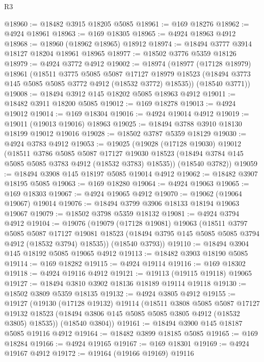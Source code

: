\begin{lexlean}{R3}
\begin{coremodule}
@18960 := @18482 @3915 @18205 @5085
@18961 := @169 @18276
@18962 := @4924 @18961
@18963 := @169 @18305
@18965 := @4924 @18963 @4912
@18968 := @18960 (@18962 @18965) @18912
@18974 := @18494 @3777 @3914 @18127 @18204 @18961 @18965
@18977 := @18502 @3776 @5359 @18126
@18979 := @4924 @3772 @4912
@19002 := @18974
    (@18977
      (@17128 @18979)
      @18961
      (@18511
        @3775
        @5085
        @5087
        @17127
        @18979
        @18523
        (@18494 @3773 @145 @5085 @5085 @3772 @4912 (@18532 @3772) @18535))
      (@18540 @3771))
@19008 := @18494 @3912 @145 @18202 @5085 @18963 @4912
@19011 := @18482 @3911 @18200 @5085
@19012 := @169 @18278
@19013 := @4924 @19012
@19014 := @169 @18304
@19016 := @4924 @19014 @4912
@19019 := @19011 (@19013 @19016) @18963
@19025 := @18494 @3788 @3910 @18130 @18199 @19012 @19016
@19028 := @18502 @3787 @5359 @18129
@19030 := @4924 @3783 @4912
@19053 := @19025
    (@19028
      (@17128 @19030)
      @19012
      (@18511
        @3786
        @5085
        @5087
        @17127
        @19030
        @18523
        (@18494 @3784 @145 @5085 @5085 @3783 @4912 (@18532 @3783) @18535))
      (@18540 @3782))
@19059 := @18494 @3908 @145 @18197 @5085 @19014 @4912
@19062 := @18482 @3907 @18195 @5085
@19063 := @169 @18280
@19064 := @4924 @19063
@19065 := @169 @18303
@19067 := @4924 @19065 @4912
@19070 := @19062 (@19064 @19067) @19014
@19076 := @18494 @3799 @3906 @18133 @18194 @19063 @19067
@19079 := @18502 @3798 @5359 @18132
@19081 := @4924 @3794 @4912
@19104 := @19076
    (@19079
      (@17128 @19081)
      @19063
      (@18511
        @3797
        @5085
        @5087
        @17127
        @19081
        @18523
        (@18494 @3795 @145 @5085 @5085 @3794 @4912 (@18532 @3794) @18535))
      (@18540 @3793))
@19110 := @18494 @3904 @145 @18192 @5085 @19065 @4912
@19113 := @18482 @3903 @18190 @5085
@19114 := @169 @18282
@19115 := @4924 @19114
@19116 := @169 @18302
@19118 := @4924 @19116 @4912
@19121 := @19113 (@19115 @19118) @19065
@19127 := @18494 @3810 @3902 @18136 @18189 @19114 @19118
@19130 := @18502 @3809 @5359 @18135
@19132 := @4924 @3805 @4912
@19155 := @19127
    (@19130
      (@17128 @19132)
      @19114
      (@18511
        @3808
        @5085
        @5087
        @17127
        @19132
        @18523
        (@18494 @3806 @145 @5085 @5085 @3805 @4912 (@18532 @3805) @18535))
      (@18540 @3804))
@19161 := @18494 @3900 @145 @18187 @5085 @19116 @4912
@19164 := @18482 @3899 @18185 @5085
@19165 := @169 @18284
@19166 := @4924 @19165
@19167 := @169 @18301
@19169 := @4924 @19167 @4912
@19172 := @19164 (@19166 @19169) @19116

\end{coremodule}
\end{lexlean}
